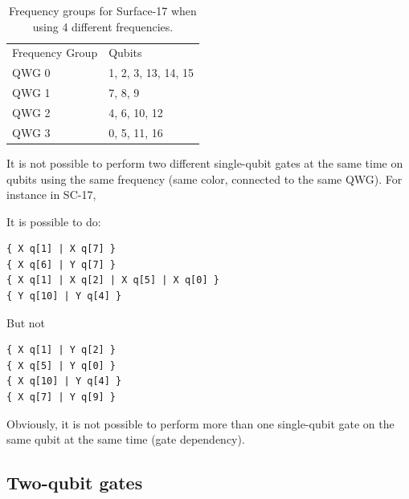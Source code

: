 \documentclass[11pt]{article}
\begin{document}
\begin{table}[h!]


\caption{\label{T3}
Frequency groups for Surface-17 when using 4 different frequencies.}
\centering
\begin{tabular}{ll}
 & \\
\hline
Frequency Group & Qubits\\
\hline
\cellcolor{red!25} QWG 0 & \cellcolor{red!25} 1, 2, 3, 13, 14, 15\\
\cellcolor{pink!25} QWG 1 & \cellcolor{pink!25} 7, 8, 9\\
\cellcolor{green!25} QWG 2 & \cellcolor{green!25} 4, 6, 10, 12\\
\cellcolor{cyan!25} QWG 3 & \cellcolor{cyan!25} 0, 5, 11, 16\\
\hline
\end{tabular}
\end{table}


\newpage
It is not possible to perform two different single-qubit gates at the same time on qubits using the same frequency (same color, connected to the same QWG). For instance in SC-17,

\begin{minipage}[t]{.45\textwidth}

It is possible to do:

\begin{verbatim}
{ X q[1] | X q[7] }
{ X q[6] | Y q[7] }
{ X q[1] | X q[2] | X q[5] | X q[0] }
{ Y q[10] | Y q[4] }

\end{verbatim}

\end{minipage}
\hfill %
\begin{minipage}[t]{.45\textwidth}

But not

\begin{verbatim}
{ X q[1] | Y q[2] }
{ X q[5] | Y q[0] }
{ X q[10] | Y q[4] }
{ X q[7] | Y q[9] }
\end{verbatim}

\end{minipage}

Obviously, it is not possible to perform more than one single-qubit gate on the same qubit at the same time (gate dependency).

\subsection{Two-qubit gates}
\end{document}
